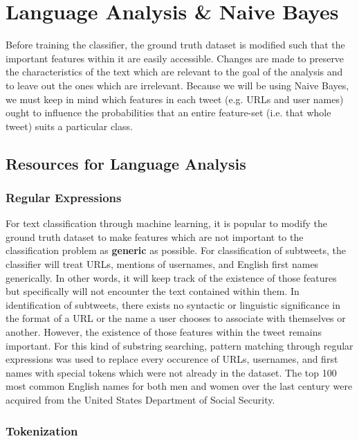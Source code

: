 \documentclass[11pt, twoside, reqno]{book}
\begin{document}
\section{Language Analysis \& Naive Bayes}
\label{language_analysis}

Before training the classifier, the ground truth dataset is modified such that the important features within it are easily accessible. Changes are made to preserve the characteristics of the text which are relevant to the goal of the analysis and to leave out the ones which are irrelevant. Because we will be using Naive Bayes, we must keep in mind which features in each tweet (e.g. URLs and user names) ought to influence the probabilities that an entire feature-set (i.e. that whole tweet) suits a particular class.

\subsection{Resources for Language Analysis}
\label{resource}

\subsubsection{Regular Expressions}
\label{regular_expressions}

For text classification through machine learning, it is popular to modify the ground truth dataset to make features which are not important to the classification problem as \textbf{generic} as possible. For classification of subtweets, the classifier will treat URLs, mentions of usernames, and English first names generically. In other words, it will keep track of the existence of those features but specifically will not encounter the text contained within them. In identification of subtweets, there exists no syntactic or linguistic significance in the format of a URL or the name a user chooses to associate with themselves or another. However, the existence of those features within the tweet remains important. For this kind of substring searching, pattern matching through regular expressions was used to replace every occurence of URLs, usernames, and first names with special tokens which were not already in the dataset. The top 100 most common English names for both men and women over the last century were acquired from the United States Department of Social Security.

\subsubsection{Tokenization}
\label{tokenization}
\end{document}
